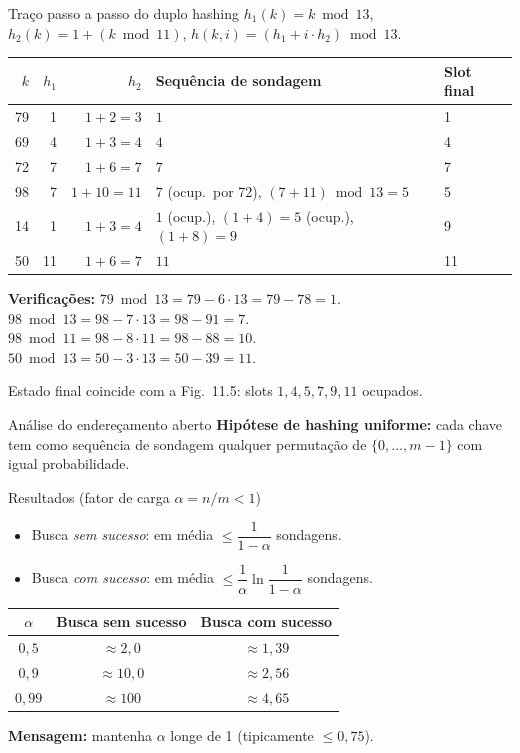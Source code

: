 \documentclass[aspectratio=169]{beamer}
\begin{document}
\begin{frame}[shrink=15]{Traço passo a passo do duplo hashing}
$h_1(k) = k \bmod 13$, $h_2(k) = 1 + (k \bmod 11)$, $h(k,i) = (h_1 + i\cdot h_2) \bmod 13$.

\smallskip
\centering
\begin{tabular}{rrrll}
\toprule
$k$ & $h_1$ & $h_2$ & Sequência de sondagem & Slot final \\
\midrule
79 & 1 & $1+2=3$ & $1$ & 1 \\
69 & 4 & $1+3=4$ & $4$ & 4 \\
72 & 7 & $1+6=7$ & $7$ & 7 \\
98 & 7 & $1+10=11$ & $7$ (ocup.\ por 72), $(7+11)\bmod 13 = 5$ & 5 \\
14 & 1 & $1+3=4$ & $1$ (ocup.), $(1+4)=5$ (ocup.), $(1+8)=9$ & 9 \\
50 & 11 & $1+6=7$ & $11$ & 11 \\
\bottomrule
\end{tabular}

\smallskip
\textbf{Verificações:}
$79 \bmod 13 = 79 - 6\cdot 13 = 79 - 78 = 1$.\ \  $98 \bmod 13 = 98 - 7\cdot 13 = 98 - 91 = 7$.\\
$98 \bmod 11 = 98 - 8\cdot 11 = 98 - 88 = 10$.\ \  $50 \bmod 13 = 50 - 3\cdot 13 = 50 - 39 = 11$.

\smallskip
Estado final coincide com a Fig.\ 11.5: slots $1, 4, 5, 7, 9, 11$ ocupados.
\end{frame}

\begin{frame}[shrink=15]{Análise do endereçamento aberto}
\textbf{Hipótese de hashing uniforme:} cada chave tem como sequência de sondagem qualquer permutação de $\{0,\dots,m-1\}$ com igual probabilidade.

\begin{block}{Resultados (fator de carga $\alpha = n/m < 1$)}
\begin{itemize}
\item Busca \emph{sem sucesso}: em média $\le \dfrac{1}{1-\alpha}$ sondagens.
\item Busca \emph{com sucesso}: em média $\le \dfrac{1}{\alpha}\ln\dfrac{1}{1-\alpha}$ sondagens.
\end{itemize}
\end{block}

\centering
\begin{tabular}{ccc}
\toprule
$\alpha$ & Busca sem sucesso & Busca com sucesso \\
\midrule
$0{,}5$ & $\approx 2{,}0$ & $\approx 1{,}39$ \\
$0{,}9$ & $\approx 10{,}0$ & $\approx 2{,}56$ \\
$0{,}99$ & $\approx 100$ & $\approx 4{,}65$ \\
\bottomrule
\end{tabular}

\vspace{0.2cm}
\textbf{Mensagem:} mantenha $\alpha$ longe de 1 (tipicamente $\le 0{,}75$).
\end{frame}
\end{document}
